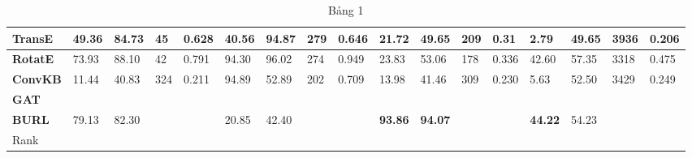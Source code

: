 \begin{table}[ht]
{\begin{tabular}{lllllllllllllllll}
\multicolumn{1}{|l|}{\textbf{TransE}} &
  \multicolumn{1}{l|}{49.36} &
  \multicolumn{1}{l|}{84.73} &
  \multicolumn{1}{l|}{45} &
  \multicolumn{1}{l|}{0.628} &
  \multicolumn{1}{l|}{40.56} &
  \multicolumn{1}{l|}{94.87} &
  \multicolumn{1}{l|}{279} &
  \multicolumn{1}{l|}{0.646} &
  \multicolumn{1}{l|}{21.72} &
  \multicolumn{1}{l|}{49.65} &
  \multicolumn{1}{l|}{209} &
  \multicolumn{1}{l|}{0.31} &
  \multicolumn{1}{l|}{2.79} &
  \multicolumn{1}{l|}{49.65} &
  \multicolumn{1}{l|}{3936} &
  \multicolumn{1}{l|}{0.206} \\ \hline
\multicolumn{1}{|l|}{\textbf{RotatE}} &
  \multicolumn{1}{l|}{73.93} &
  \multicolumn{1}{l|}{88.10} &
  \multicolumn{1}{l|}{42} &
  \multicolumn{1}{l|}{0.791} &
  \multicolumn{1}{l|}{94.30} &
  \multicolumn{1}{l|}{96.02} &
  \multicolumn{1}{l|}{274} &
  \multicolumn{1}{l|}{0.949} &
  \multicolumn{1}{l|}{23.83} &
  \multicolumn{1}{l|}{53.06} &
  \multicolumn{1}{l|}{178} &
  \multicolumn{1}{l|}{0.336} &
  \multicolumn{1}{l|}{42.60} &
  \multicolumn{1}{l|}{57.35} &
  \multicolumn{1}{l|}{3318} &
  \multicolumn{1}{l|}{0.475} \\ \hline
\multicolumn{1}{|l|}{\textbf{ConvKB}} &
  \multicolumn{1}{l|}{11.44} &
  \multicolumn{1}{l|}{40.83} &
  \multicolumn{1}{l|}{324} &
  \multicolumn{1}{l|}{0.211} &
  \multicolumn{1}{l|}{94.89} &
  \multicolumn{1}{l|}{52.89} &
  \multicolumn{1}{l|}{202} &
  \multicolumn{1}{l|}{0.709} &
  \multicolumn{1}{l|}{13.98} &
  \multicolumn{1}{l|}{41.46} &
  \multicolumn{1}{l|}{309} &
  \multicolumn{1}{l|}{0.230} &
  \multicolumn{1}{l|}{5.63} &
  \multicolumn{1}{l|}{52.50} &
  \multicolumn{1}{l|}{3429} &
  \multicolumn{1}{l|}{0.249} \\ \hline
\multicolumn{1}{|l|}{\textbf{GAT}} &
  \multicolumn{1}{l|}{} &
  \multicolumn{1}{l|}{} &
  \multicolumn{1}{l|}{} &
  \multicolumn{1}{l|}{} &
  \multicolumn{1}{l|}{} &
  \multicolumn{1}{l|}{} &
  \multicolumn{1}{l|}{} &
  \multicolumn{1}{l|}{} &
  \multicolumn{1}{l|}{} &
  \multicolumn{1}{l|}{} &
  \multicolumn{1}{l|}{} &
  \multicolumn{1}{l|}{} &
  \multicolumn{1}{l|}{} &
  \multicolumn{1}{l|}{} &
  \multicolumn{1}{l|}{} &
  \multicolumn{1}{l|}{} \\ \hline
\multicolumn{1}{|l|}{\textbf{BURL}} &
  \multicolumn{1}{l|}{79.13} &
  \multicolumn{1}{l|}{82.30} &
  \multicolumn{1}{l|}{} &
  \multicolumn{1}{l|}{} &
  \multicolumn{1}{l|}{20.85} &
  \multicolumn{1}{l|}{42.40} &
  \multicolumn{1}{l|}{} &
  \multicolumn{1}{l|}{} &
  \multicolumn{1}{l|}{\textbf{93.86}} &
  \multicolumn{1}{l|}{\textbf{94.07}} &
  \multicolumn{1}{l|}{} &
  \multicolumn{1}{l|}{} &
  \multicolumn{1}{l|}{\textbf{44.22}} &
  \multicolumn{1}{l|}{54.23} &
  \multicolumn{1}{l|}{} &
  \multicolumn{1}{l|}{} \\ \hline
Rank &
   &
   &
   &
   &
   &
   &
   &
   &
   &
   &
   &
   &
   &
   &
   &

\end{tabular}}
\caption{Bảng 1}
\end{table}

